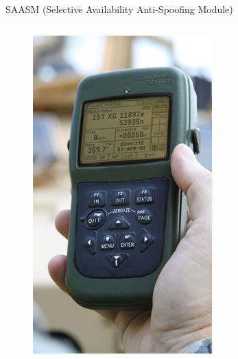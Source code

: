 \begin{frame}{SAASM (Selective Availability Anti-Spoofing Module)}

    \begin{columns}[c, onlytextwidth]

        \begin{column}{0.35\textwidth}

            \begin{figure}
                \centering
                \includegraphics[width=\textwidth]{img/SAASM.png}
            \end{figure}


\end{column}
\end{columns}
\end{frame}
